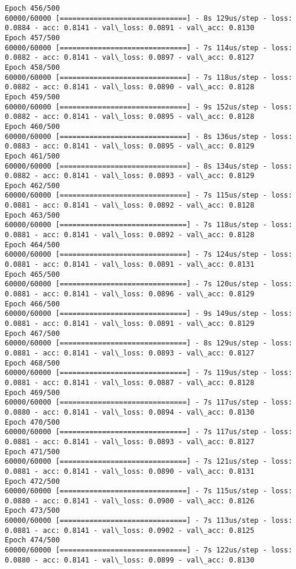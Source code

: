 \documentclass[11pt]{article}
\begin{document}
\begin{Verbatim}[commandchars=\\\{\}]
Epoch 456/500
60000/60000 [==============================] - 8s 129us/step - loss: 0.0884 - acc: 0.8141 - val\_loss: 0.0891 - val\_acc: 0.8130
Epoch 457/500
60000/60000 [==============================] - 7s 114us/step - loss: 0.0882 - acc: 0.8141 - val\_loss: 0.0897 - val\_acc: 0.8127
Epoch 458/500
60000/60000 [==============================] - 7s 118us/step - loss: 0.0882 - acc: 0.8141 - val\_loss: 0.0890 - val\_acc: 0.8128
Epoch 459/500
60000/60000 [==============================] - 9s 152us/step - loss: 0.0882 - acc: 0.8141 - val\_loss: 0.0895 - val\_acc: 0.8128
Epoch 460/500
60000/60000 [==============================] - 8s 136us/step - loss: 0.0883 - acc: 0.8141 - val\_loss: 0.0895 - val\_acc: 0.8129
Epoch 461/500
60000/60000 [==============================] - 8s 134us/step - loss: 0.0882 - acc: 0.8141 - val\_loss: 0.0893 - val\_acc: 0.8129
Epoch 462/500
60000/60000 [==============================] - 7s 115us/step - loss: 0.0881 - acc: 0.8141 - val\_loss: 0.0892 - val\_acc: 0.8128
Epoch 463/500
60000/60000 [==============================] - 7s 118us/step - loss: 0.0881 - acc: 0.8141 - val\_loss: 0.0892 - val\_acc: 0.8128
Epoch 464/500
60000/60000 [==============================] - 7s 124us/step - loss: 0.0881 - acc: 0.8141 - val\_loss: 0.0891 - val\_acc: 0.8131
Epoch 465/500
60000/60000 [==============================] - 7s 120us/step - loss: 0.0881 - acc: 0.8141 - val\_loss: 0.0896 - val\_acc: 0.8129
Epoch 466/500
60000/60000 [==============================] - 9s 149us/step - loss: 0.0881 - acc: 0.8141 - val\_loss: 0.0891 - val\_acc: 0.8129
Epoch 467/500
60000/60000 [==============================] - 8s 129us/step - loss: 0.0881 - acc: 0.8141 - val\_loss: 0.0893 - val\_acc: 0.8127
Epoch 468/500
60000/60000 [==============================] - 7s 119us/step - loss: 0.0881 - acc: 0.8141 - val\_loss: 0.0887 - val\_acc: 0.8128
Epoch 469/500
60000/60000 [==============================] - 7s 117us/step - loss: 0.0880 - acc: 0.8141 - val\_loss: 0.0894 - val\_acc: 0.8130
Epoch 470/500
60000/60000 [==============================] - 7s 117us/step - loss: 0.0881 - acc: 0.8141 - val\_loss: 0.0893 - val\_acc: 0.8127
Epoch 471/500
60000/60000 [==============================] - 7s 121us/step - loss: 0.0881 - acc: 0.8141 - val\_loss: 0.0890 - val\_acc: 0.8131
Epoch 472/500
60000/60000 [==============================] - 7s 115us/step - loss: 0.0880 - acc: 0.8141 - val\_loss: 0.0900 - val\_acc: 0.8126
Epoch 473/500
60000/60000 [==============================] - 7s 113us/step - loss: 0.0881 - acc: 0.8141 - val\_loss: 0.0902 - val\_acc: 0.8125
Epoch 474/500
60000/60000 [==============================] - 7s 122us/step - loss: 0.0880 - acc: 0.8141 - val\_loss: 0.0899 - val\_acc: 0.8130

\end{Verbatim}
\end{document}
